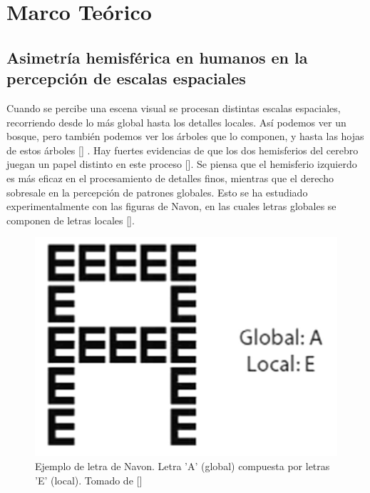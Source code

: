 \chapter{Marco Te\'orico}\label{chapter:theory}

\section{Asimetría hemisférica en humanos en la percepción de escalas espaciales}

Cuando se percibe una escena visual se procesan distintas escalas espaciales, recorriendo desde lo más global hasta los detalles locales.  Así podemos ver un bosque, pero también podemos ver los árboles que lo componen, y hasta las hojas de estos árboles [\cite{wagemans_perception_2014}] . Hay fuertes evidencias de que los dos hemisferios del cerebro juegan un papel distinto en este proceso [\cite{flevaris_spatial_2016}]. Se piensa que el hemisferio izquierdo es más eficaz en el procesamiento de detalles finos, mientras que el derecho sobresale en la percepción de patrones globales. Esto se ha estudiado experimentalmente con las figuras de Navon, en las cuales letras globales se componen de letras locales [\cite{navon_forest_1977}]. 
\begin{figure}[h]
	\centering
	\includegraphics[scale=0.5]{Graphics/navon}
	\caption{Ejemplo de letra de Navon. Letra 'A' (global) compuesta por letras 'E' (local). Tomado de [\cite{flevaris_spatial_2016}]}
	\label{fig:navon}
\end{figure}
